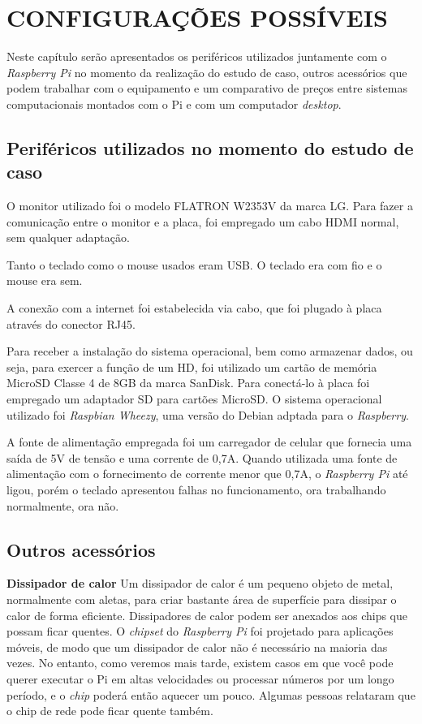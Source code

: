 \chapter{CONFIGURAÇÕES POSSÍVEIS}

Neste capítulo serão apresentados os periféricos utilizados juntamente com o \textit{Raspberry Pi} no momento da realização do estudo de caso, outros acessórios que podem trabalhar com o equipamento e um comparativo de preços entre sistemas computacionais montados com o Pi e com um computador \textit{desktop}.

\section{Periféricos utilizados no momento do estudo de caso}

O monitor utilizado foi o modelo FLATRON W2353V da marca LG. Para fazer a comunicação entre o monitor e a placa, foi empregado um cabo HDMI normal, sem qualquer adaptação.

Tanto o teclado como o mouse usados eram USB. O teclado era com fio e o mouse era sem.

A conexão com a internet foi estabelecida via cabo, que foi plugado à placa através do conector RJ45.

Para receber a instalação do sistema operacional, bem como armazenar dados, ou seja, para exercer a função de um HD, foi utilizado um cartão de memória MicroSD Classe 4 de 8GB da marca SanDisk. Para conectá-lo à placa foi empregado um adaptador SD para cartões MicroSD. O sistema operacional utilizado foi \textit{Raspbian Wheezy}, uma versão do Debian adptada para o \textit{Raspberry}.

A fonte de alimentação empregada foi um carregador de celular que fornecia uma saída de 5V de tensão e uma corrente de 0,7A. Quando utilizada uma fonte de alimentação com o fornecimento de corrente menor que 0,7A, o \textit{Raspberry Pi} até ligou, porém o teclado apresentou falhas no funcionamento, ora trabalhando normalmente, ora não.

\section{Outros acessórios}

\textbf{Dissipador de calor} Um dissipador de calor é um pequeno objeto de metal, normalmente com aletas, para criar bastante área de superfície para dissipar o calor de forma eficiente. Dissipadores de calor podem ser anexados aos chips que possam ficar quentes. O \textit{chipset} do \textit{Raspberry Pi} foi projetado para aplicações móveis, de modo que um dissipador de calor não é necessário na maioria das vezes. No entanto, como veremos mais tarde, existem casos em que você pode querer executar o Pi em altas velocidades ou processar números por um longo período, e o \textit{chip} poderá então aquecer um pouco. Algumas pessoas relataram que o chip de rede pode ficar quente também.

